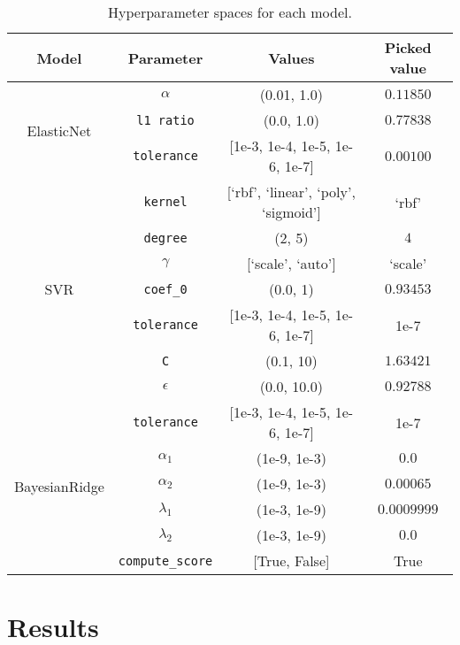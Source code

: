 \documentclass[12pt]{article}
\begin{document}
\begin{table}[H]
    \centering
    \begin{tabular}{|c|c|c|c|}
        \hline
        \textbf{Model} & \textbf{Parameter} & \textbf{Values} & \textbf{Picked value} \\
        \hline
        \multirow{3}{*}{ElasticNet} 
            & \texttt{$\alpha$} & (0.01, 1.0) & $0.11850$ \\
            & \texttt{l1 ratio} & (0.0, 1.0) & $0.77838$ \\
            & \texttt{tolerance} & [1e-3, 1e-4, 1e-5, 1e-6, 1e-7] & $0.00100$ \\
        \hline
        \multirow{7}{*}{SVR} 
            & \texttt{kernel} & [`rbf', `linear', `poly', `sigmoid'] & `rbf' \\
            & \texttt{degree} & (2, 5) & $4$ \\
            & \texttt{$\gamma$} & [`scale', `auto'] & `scale' \\
            & \texttt{coef\_0} & (0.0, 1) & $0.93453$ \\
            & \texttt{tolerance} & [1e-3, 1e-4, 1e-5, 1e-6, 1e-7] & 1e-7 \\
            & \texttt{C} & (0.1, 10) & $1.63421$ \\
            & \texttt{$\epsilon$} & (0.0, 10.0) & $0.92788$ \\
        \hline
        \multirow{6}{*}{BayesianRidge} 
            & \texttt{tolerance} & [1e-3, 1e-4, 1e-5, 1e-6, 1e-7] & 1e-7 \\
            & \texttt{$\alpha_1$} & (1e-9, 1e-3) & $0.0$ \\
            & \texttt{$\alpha_2$} & (1e-9, 1e-3) & $0.00065$ \\
            & \texttt{$\lambda_1$} & (1e-3, 1e-9) & $0.0009999$ \\
            & \texttt{$\lambda_2$} & (1e-3, 1e-9) & $0.0$ \\
            & \texttt{compute\_score} & [True, False] & True \\
        \hline
    \end{tabular}
    \caption{Hyperparameter spaces for each model.}
    \label{tab:hyperparams}
\end{table}

\section{Results}
\end{document}
